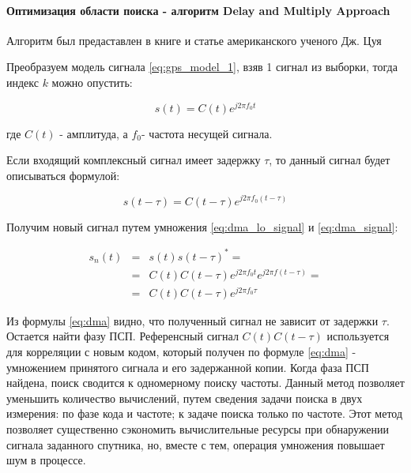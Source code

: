 \paragraph{Оптимизация области поиска - алгоритм Delay and Multiply Approach}
\label{ssec:dma}

Алгоритм был предаставлен в книге и статье американского ученого Дж.
Цуя \cite{lin_dma, tsui}

Преобразуем модель сигнала \ref{eq:gps_model_1}, взяв 1 сигнал из выборки, тогда индекс $k$ можно опустить:
\begin{center}
\begin{equation}
	\label{eq:dma_lo_signal}
	s(t)=C(t)e^{j2{\pi}f_{0}t}
\end{equation}
\end{center}
где $C(t)$ - амплитуда, а $f_{0}$- частота несущей сигнала.

Если входящий комплексный сигнал имеет задержку $\tau$, то данный
сигнал будет описываться формулой: 

\begin{center}
\begin{equation}
	\label{eq:dma_signal}
	s(t-\tau)=C(t-\tau)e^{j2{\pi}f_{0}(t-\tau)}
\end{equation}
\end{center}

Получим новый сигнал путем умножения \ref{eq:dma_lo_signal} и \ref{eq:dma_signal}:

\begin{center}
\begin{eqnarray}
	s_{n}(t) & = & s(t)s(t-\tau)^{*}=\nonumber \\
	 & = & C(t)C(t-\tau)e^{j2\pi f_{0}t}e^{j2\pi f(t-\tau)}=\label{eq:dma}\\
	 & = & C(t)C(t-\tau)e^{j2\pi f_{0}\tau}\nonumber 
\end{eqnarray}

\par\end{center}

Из формулы \ref{eq:dma} видно, что полученный сигнал не зависит от
задержки $\tau$. Остается найти фазу ПСП. Референсный сигнал
$C(t)C(t-\tau)$ используется для корреляции с новым кодом, который
получен по формуле \ref{eq:dma} - умножением принятого сигнала и его задержанной
копии. Когда фаза ПСП найдена, поиск сводится к одномерному поиску
частоты. Данный метод позволяет уменьшить количество вычислений, путем
сведения задачи поиска в двух измерения: по фазе кода и частоте; к
задаче поиска только по частоте. Этот метод позволяет существенно
сэкономить вычислительные ресурсы при обнаружении сигнала заданного
спутника, но, вместе с тем, операция умножения повышает шум в процессе.


